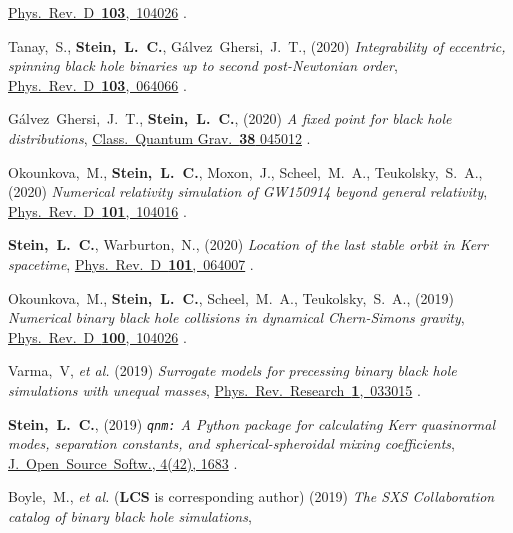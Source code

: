 \begin{etaremune}[start=\value{pubCounter}]
  \href{https://doi.org/10.1103/PhysRevD.103.104026}%
  {Phys.~Rev.~D~{\bf 103},~104026}
  .
\item
  Tanay,~S.,
  {\bf Stein,~L.~C.},
  Gálvez~Ghersi,~J.~T.,
  (2020)
  {\it Integrability of eccentric, spinning black hole binaries up to second post-Newtonian order},
  \href{https://doi.org/10.1103/PhysRevD.103.064066}%
  {Phys.~Rev.~D~{\bf 103},~064066}
  .
\item
  Gálvez~Ghersi,~J.~T.,
  {\bf Stein,~L.~C.},
  (2020)
  {\it A fixed point for black hole distributions},
  \href{https://doi.org/10.1088/1361-6382/abcfd2}
  {Class.~Quantum Grav.~{\bf 38} 045012}
  .
\item
  Okounkova,~M.,
  {\bf Stein,~L.~C.},
  Moxon,~J.,
  Scheel,~M.~A.,
  Teukolsky,~S.~A.,
  (2020)
  {\it Numerical relativity simulation of GW150914 beyond general relativity},
  \href{https://doi.org/10.1103/PhysRevD.101.104016}{Phys.~Rev.~D~{\bf 101},~104016}
  .
\item
  {\bf Stein,~L.~C.},
  Warburton,~N.,
  (2020)
  {\it Location of the last stable orbit in Kerr spacetime},
  \href{https://doi.org/10.1103/PhysRevD.101.064007}{Phys.~Rev.~D~{\bf 101},~064007}
  .
\item
  Okounkova,~M.,
  {\bf Stein,~L.~C.},
  Scheel,~M.~A.,
  Teukolsky,~S.~A.,
  (2019)
  {\it Numerical binary black hole collisions in dynamical Chern-Simons gravity},
  \href{https://doi.org/10.1103/PhysRevD.100.104026}{Phys.~Rev.~D~{\bf 100},~104026}
  .
\item
  Varma,~V, {\it et al.}
  (2019)
  {\it Surrogate models for precessing binary black hole simulations with
  unequal masses},
  \href{https://doi.org/10.1103/PhysRevResearch.1.033015}{Phys.~Rev.~Research~{\bf 1},~033015}
  .
\item
  {\bf Stein,~L.~C.},
  (2019)
  \hspace{0.1em}
  {\it {\tt qnm:} A Python package for calculating Kerr quasinormal modes, separation constants, and spherical-spheroidal mixing coefficients},
  \href{https://doi.org/10.21105/joss.01683}{J.~Open~Source~Softw., 4(42), 1683}
  .
\item
  Boyle,~M., {\it et al.} ({\bf LCS} is corresponding author)
  (2019)
  {\it The SXS Collaboration catalog of binary black hole simulations},

\end{etaremune}
